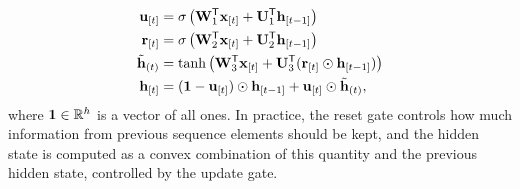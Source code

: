 \begin{align*}
    \Elem{u}{t} &= \sigma\Paren{\Matrix{W}_{1}^{\Transpose}\Elem{x}{t} + \Matrix{U}_{1}^{\Transpose}\Elem{h}{t-1}}\\
    \Elem{r}{t} &= \sigma\Paren{\Matrix{W}_{2}^{\Transpose}\Elem{x}{t} + \Matrix{U}_{2}^{\Transpose}\Elem{h}{t-1}}\\
    \tilde{\Vector{h}}_{(t)} &= \Fun{tanh}\Paren{\Matrix{W}_{3}^{\Transpose}\Elem{x}{t} + \Matrix{U}_{3}^{\Transpose}(\Elem{r}{t} \odot \Elem{h}{t-1})}\\
    \Elem{h}{t} &= (\boldsymbol{1} - \Elem{u}{t}) \odot \Elem{h}{t-1} + \Elem{u}{t} \odot \tilde{\Vector{h}}_{(t)},
\end{align*}
where $\boldsymbol{1} \in \mathbb{R}^h$ is a vector of all ones. In practice, the reset gate controls how much information from previous sequence elements should be kept, and the hidden state is computed as a convex combination of this quantity and the previous hidden state, controlled by the update gate. 

